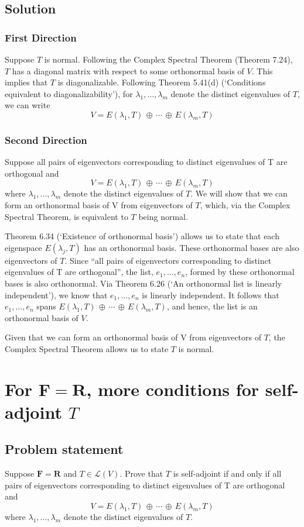 \documentclass{article}
\begin{document}
\subsection*{Solution}
\subsubsection*{First Direction}
Suppose $T$ is normal. Following the Complex Spectral Theorem (Theorem 7.24), $T$ has a diagonal matrix with respect to some orthonormal basis of $V$. This implies that $T$ is diagonalizable. Following Theorem 5.41(d) (`Conditions equivalent to diagonalizability'), for $\lambda_1,\ldots,\lambda_m$ denote the distinct eigenvalues of $T$, we can write 
\[V=E(\lambda_1,T)\,\oplus\,\cdots\,\oplus\,E(\lambda_m,T)\]

\subsubsection*{Second Direction}
Suppose all pairs of eigenvectors corresponding to distinct eigenvalues of T are orthogonal and
\[V=E(\lambda_1,T)\,\oplus\,\cdots\,\oplus\,E(\lambda_m,T)\]
where $\lambda_1,\ldots,\lambda_m$ denote the distinct eigenvalues of $T$. We will show that we can form an orthonormal basis of V from eigenvectors of $T$, which, via the Complex Spectral Theorem, is equivalent to $T$ being normal.

Theorem 6.34 (`Existence of orthonormal basis') allows us to state that each eigenspace $E(\lambda_j,T)$ has an orthonormal basis. These orthonormal bases are also eigenvectors of $T$. Since ``all pairs of eigenvectors corresponding to distinct eigenvalues of T are orthogonal'', the list, $e_1,\ldots,e_n$, formed by these orthonormal bases is also orthonormal. Via Theorem 6.26 (`An orthonormal list is linearly independent'), we know that $e_1,\ldots,e_n$ is linearly independent. It follows that $e_1,\ldots,e_n$ spans $E(\lambda_1,T)\,\oplus\,\cdots\,\oplus\,E(\lambda_m,T)$, and hence, the list is an orthonormal basis of $V$.

Given that we can form an orthonormal basis of V from eigenvectors of $T$, the Complex Spectral Theorem allows us to state $T$ is normal.

\clearpage

\section{For $\mathbf{F}=\mathbf{R}$, more conditions for self-adjoint $T$}
\subsection*{Problem statement}
Suppose $\mathbf{F}=\mathbf{R}$ and $T\in\mathcal{L}(V)$. Prove that $T$ is self-adjoint if and only if all pairs of eigenvectors corresponding to distinct eigenvalues of T are orthogonal and
\[V=E(\lambda_1,T)\,\oplus\,\cdots\,\oplus\,E(\lambda_m,T)\]
where $\lambda_1,\ldots,\lambda_m$ denote the distinct eigenvalues of $T$.
\end{document}
